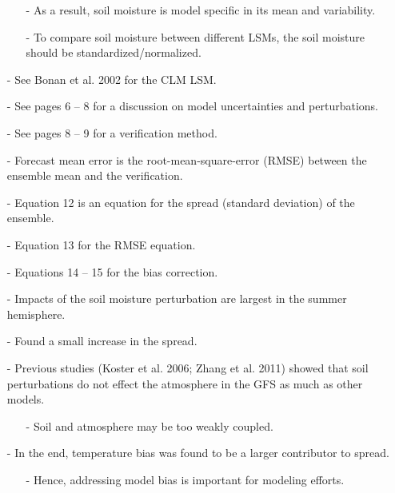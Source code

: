 \documentclass[12pt, letterpaper]{article}
\begin{document}
\begin{itemize}
        \begin{itemize}
        	\item[-] As a result, soil moisture is model specific in its mean and variability.
        	\item[-] To compare soil moisture between different LSMs, the soil moisture should be
        	         standardized/normalized.
        \end{itemize}
        \item[-] See Bonan et al. 2002 for the CLM LSM.
        \item[-] See pages 6 -- 8 for a discussion on model uncertainties and perturbations.
        \item[-] See pages 8 -- 9 for a verification method.
        \item[-] Forecast mean error is the root-mean-square-error (RMSE) between the ensemble mean and
                 the verification.
        \item[-] Equation 12 is an equation for the spread (standard deviation) of the ensemble.
        \item[-] Equation 13 for the RMSE equation.
        \item[-] Equations 14 -- 15 for the bias correction.
        \item[-] Impacts of the soil moisture perturbation are largest in the summer hemisphere.
        \item[-] Found a small increase in the spread.
        \item[-] Previous studies (Koster et al. 2006; Zhang et al. 2011) showed that soil perturbations
                 do not effect the atmosphere in the GFS as much as other models.
        \begin{itemize}
        	\item[-] Soil and atmosphere may be too weakly coupled.
        \end{itemize}
        \item[-] In the end, temperature bias was found to be a larger contributor to spread.
        \begin{itemize}
        	\item[-] Hence, addressing model bias is important for modeling efforts.
        \end{itemize}
    \end{itemize}
\end{document}

